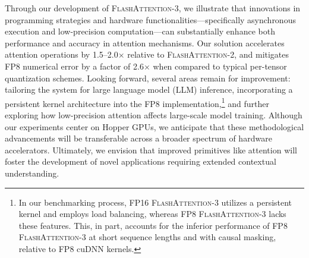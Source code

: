 Through our development of \textsc{FlashAttention-3}, we illustrate that innovations in programming strategies and hardware functionalities—specifically asynchronous execution and low-precision computation—can substantially enhance both performance and accuracy in attention mechanisms. Our solution accelerates attention operations by 1.5--2.0$\times$ relative to \textsc{FlashAttention-2}, and mitigates FP8 numerical error by a factor of 2.6$\times$ when compared to typical per-tensor quantization schemes. Looking forward, several areas remain for improvement: tailoring the system for large language model (LLM) inference, incorporating a persistent kernel architecture into the FP8 implementation,\footnote{In our benchmarking process, FP16 \textsc{FlashAttention-3} utilizes a persistent kernel and employs load balancing, whereas FP8 \textsc{FlashAttention-3} lacks these features. This, in part, accounts for the inferior performance of FP8 \textsc{FlashAttention-3} at short sequence lengths and with causal masking, relative to FP8 cuDNN kernels.} and further exploring how low-precision attention affects large-scale model training. Although our experiments center on Hopper GPUs, we anticipate that these methodological advancements will be transferable across a broader spectrum of hardware accelerators. Ultimately, we envision that improved primitives like attention will foster the development of novel applications requiring extended contextual understanding.

